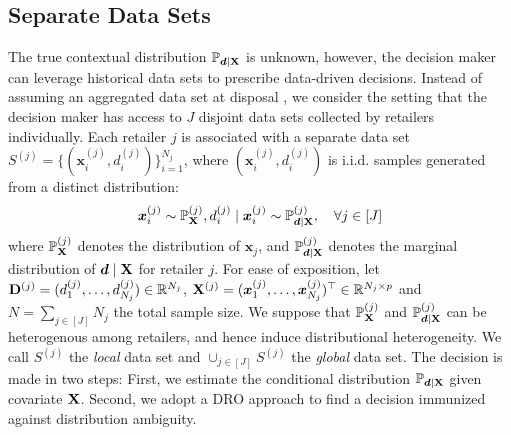 \documentclass[mnsc, nonblindrev]{informswp}
\newcommand{\1}[1]{\mathds{1}{\left(#1\right)}}
\begin{document}
\subsection {Separate Data Sets}  %
The true contextual distribution $\mathbb{P}_{\bm d \mid {\mathbf{X}}}$ is unknown, however, the decision maker can leverage historical data sets to prescribe data-driven decisions. Instead of assuming an aggregated data set at disposal \citep{notz2022prescriptive}, we consider the setting that the decision maker has access to $J$ disjoint data sets collected by retailers individually. Each retailer $j$ is associated with a separate data set $S^{(j)}=\{({\bm x}_i^{(j)},{d}_i^{(j)})\}_{i = 1}^{N_j}$, where $({\bm x}_i^{(j)},{ d}_i^{(j)})$ is i.i.d. samples generated from a distinct distribution:
\[
{\bm x}_i^{(j)} \sim \mathbb{P}^{(j)}_{{\mathbf{X}}}, { d}_i^{(j)} \mid {\bm x}_i^{(j)} \sim \mathbb{P}^{(j)}_{\bm d \mid {\mathbf{X}}}, \quad \forall j \in [J]
\]
where $\mathbb{P}^{(j)}_{{\mathbf{X}}}$ denotes the distribution of $\bm x_j$, and $\mathbb{P}^{(j)}_{\bm d \mid {\mathbf{X}}}$ denotes the marginal distribution of ${\bm d \mid {\mathbf{X}}}$ for retailer $j$. For ease of exposition, let ${\mathbf{D}}^{(j)} = ({ d}_{1}^{(j)}, \ldots, { d}_{N_j}^{(j)}) \in \mathbb{R}^{N_j}$, ${\mathbf{X}}^{(j)} = ({\bm x}_{1}^{(j)}, \ldots, {\bm x}_{N_j}^{(j)})^\top \in \mathbb{R}^{N_j \times p} $ and $N = \sum_{j \in [J]} N_j$ the total sample size. We suppose that $\mathbb{P}^{(j)}_{{\mathbf{X}}}$ and $\mathbb{P}^{(j)}_{\bm d \mid {\mathbf{X}}}$  can be heterogenous among retailers, and hence induce distributional heterogeneity. We call $S^{(j)}$ the \textit{local} data set and $\cup_{j \in [J]} S^{(j)}$ the \textit{global} data set. The decision is made in two steps: First, we estimate the conditional distribution $\mathbb{P}_{\bm d \mid {\mathbf{X}}}$ given covariate ${\mathbf{X}}$. Second, we adopt a DRO approach to find a decision immunized against distribution ambiguity.
\end{document}
